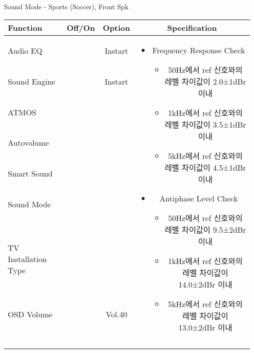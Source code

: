 \begin{frame}[t]{Sound Mode - Sports (Soccer), Front Spk}
\begin{tiny}
\begin{tabular}{@{}lccc@{}}
\toprule
Function & Off/On & Option & Specification \\
\midrule
Audio EQ & \color{black}{Off} & Instart &
\multirow{10}{60mm}{
\begin{itemize}
	\item Frequency Response Check
	\begin{itemize}
		\item 50Hz에서 ref 신호와의 레벨 차이값이 2.0±1dBr 이내
		\item 1kHz에서 ref 신호와의 레벨 차이값이 3.5±1dBr 이내
		\item 5kHz에서 ref 신호와의 레벨 차이값이 4.5±1dBr 이내	
	\end{itemize}
	\item Antiphase Level Check
	\begin{itemize}
		\item 50Hz에서 ref 신호와의 레벨 차이값이 9.5±2dBr 이내
		\item 1kHz에서 ref 신호와의 레벨 차이값이 14.0±2dBr 이내
		\item 5kHz에서 ref 신호와의 레벨 차이값이 13.0±2dBr 이내
	\end{itemize}
\end{itemize}
} \\
Sound Engine & \color{blue}{On} & Instart & \\
ATMOS & \color{black}{Off}  & & \\
Autovolume & \color{black}{Off} & & \\
Smart Sound & \color{black}{Off} & & \\
Sound Mode & \color{blue}{On} & \color{blue}{Sports} & \\
TV Installation Type & \color{blue}{On} & \color{black}{Standtype1} & \\
OSD Volume & \color{blue}{On} & Vol.40 & \\
& & & \\
& & & \\
& & & \\
& & & \\
\midrule
\end{tabular}
\end{tiny}


\end{frame}




